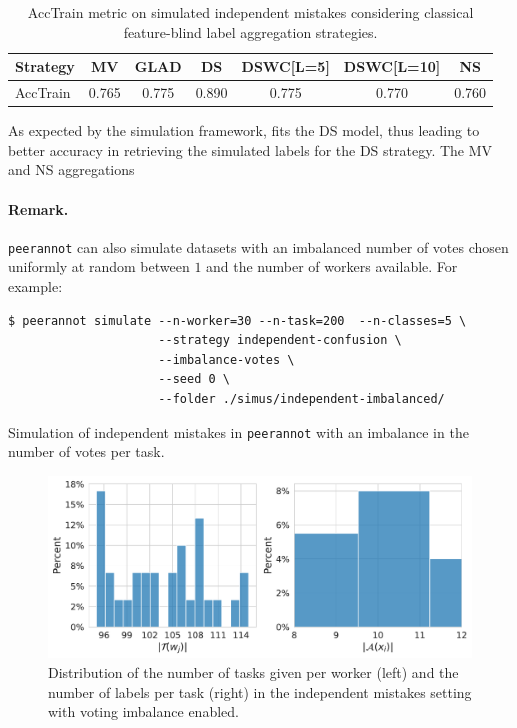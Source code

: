 \begin{table}[htbp]
    \centering
    \caption{AccTrain metric on simulated independent mistakes considering classical feature-blind label aggregation strategies.}
    \label{tab:accuracy_train_indep}
    \begin{tabular}{|l|c|c|c|c|c|c|}
    \hline
    \textbf{Strategy} & \textbf{MV} & \textbf{GLAD} & \textbf{DS} & \textbf{DSWC[L=5]} & \textbf{DSWC[L=10]} & \textbf{NS} \\
    \hline
    AccTrain & 0.765 & 0.775 & 0.890 & 0.775 & 0.770 & 0.760 \\
    \hline
    \end{tabular}
    \end{table}

As expected by the simulation framework,  fits the DS model, thus leading to better accuracy in retrieving the simulated labels for the DS strategy. The MV and NS aggregations

\paragraph*{Remark.} \texttt{peerannot} can also simulate datasets with an imbalanced number of votes chosen uniformly at random between $1$ and the number of workers available. For example:

\begin{listing}[H]
    \begin{verbatim}
$ peerannot simulate --n-worker=30 --n-task=200  --n-classes=5 \
                     --strategy independent-confusion \
                     --imbalance-votes \
                     --seed 0 \
                     --folder ./simus/independent-imbalanced/
    \end{verbatim}
    \caption{Simulation of independent mistakes in \texttt{peerannot} with an imbalance in the number of votes per task.}
    \label{lst:indep_mistakes_simu_imb}
\end{listing}

\begin{figure}[tbh]
    \centering
    \includegraphics[width=\textwidth]{./images_peerannot/fig-simu2-output-1.pdf}
    \caption{Distribution of the number of tasks given per worker (left) and the number of labels per task (right) in the independent mistakes setting with voting imbalance enabled.}
    \label{fig:desc_independent_imbalance}
\end{figure}

